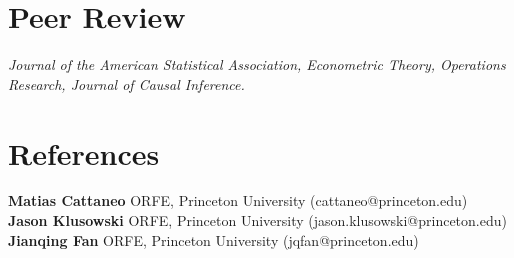 \documentclass[10pt,a4paper,roman]{moderncv}        %
\begin{document}
\section{Peer Review}
\textit{
Journal of the American Statistical Association, Econometric Theory, Operations
Research, Journal of Causal Inference.
}

\section{References}
\textbf{Matias Cattaneo} ORFE, Princeton University (cattaneo@princeton.edu)\\
\textbf{Jason Klusowski} ORFE, Princeton University (jason.klusowski@princeton.edu)\\
\textbf{Jianqing Fan} ORFE, Princeton University (jqfan@princeton.edu)


\clearpage
\end{document}
